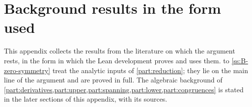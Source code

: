 \section{Background results in the form used}\label{app:background}

This appendix collects the results from the literature on which the argument rests, in the form in
which the Lean development proves and uses them.  to
\cref{ss:B-zero-symmetry} treat the analytic inputs of \cref{part:reduction}; they lie on the main line
of the argument and are proved in full. The algebraic background of
\cref{part:derivatives,part:upper,part:spanning,part:lower,part:congruences} is stated in the later
sections of this appendix, with its sources.





